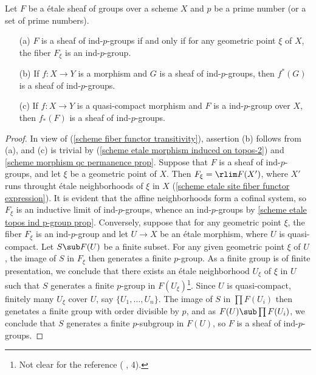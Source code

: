 \begin{proposition}\label{scheme etale sheaf ind p-group prop}
Let $F$ be a \'etale sheaf of groups over a scheme $X$ and $p$ be a prime number (or a set of prime numbers).
\begin{enumerate}
    \item[(a)] $F$ is a sheaf of ind-$p$-groups if and only if for any geometric point $\xi$ of $X$, the fiber $F_\xi$ is an ind-$p$-group.
    \item[(b)] If $f:X\to Y$ is a morphism and $G$ is a sheaf of ind-$p$-groups, then $f^*(G)$ is a sheaf of ind-$p$-groups.
    \item[(c)] If $f:X\to Y$ is a quasi-compact morphism and $F$ is a ind-$p$-group over $X$, then $f_*(F)$ is a sheaf of ind-$p$-groups.
\end{enumerate}
\end{proposition}
\begin{proof}
In view of (\ref{scheme fiber functor transitivity}), assertion (b) follows from (a), and (c) is trivial by (\ref{scheme etale morphism induced on topos-2}) and \cref{scheme morphism qc permanence prop}. Suppose that $F$ is a sheaf of ind-$p$-groups, and let $\xi$ be a geometric point of $X$. Then $F_\xi=\rlim F(X')$, where $X'$ runs throught \'etale neighborhoods of $\xi$ in $X$ (\cref{scheme etale site fiber functor expression}). It is evident that the affine neighborhoods form a cofinal system, so $F_\xi$ is an inductive limit of ind-$p$-groups, whence an ind-$p$-groups by \cref{scheme etale topos ind p-group prop}. Conversely, suppose that for any geometric point $\xi$, the fiber $F_\xi$ is an ind-$p$-group and let $U\to X$ be an \'etale morphism, where $U$ is quasi-compact. Let $S\sub F(U)$ be a finite subset. For any given geometric point $\xi$ of $U$, the image of $S$ in $F_\xi$ then generates a finite $p$-group. As a finite group is of finite presentation, we conclude that there exists an \'etale neighborhood $U_\xi$ of $\xi$ in $U$ such that $S$ generates a finite $p$-group in $F(U_\xi)$\footnote{Not clear for the reference (\cite{SGA4-2} , 4).}. Since $U$ is quasi-compact, finitely many $U_\xi$ cover $U$, say $\{U_1,\dots, U_n\}$. The image of $S$ in $\prod F(U_i)$ then genetates a finite group with order divisible by $p$, and as $F(U)\sub\prod F(U_i)$, we conclude that $S$ generates a finite $p$-subgroup in $F(U)$, so $F$ is a sheaf of ind-$p$-groups.
\end{proof}

